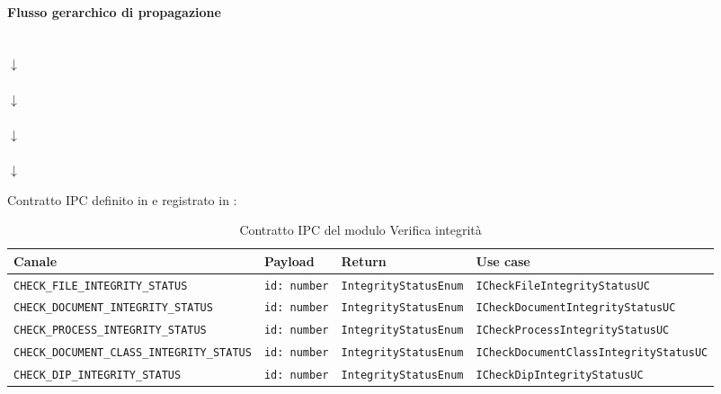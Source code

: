 \paragraph{Flusso gerarchico di propagazione}
\begin{center}
	 \\
	$\downarrow$ \\
	 \\
	$\downarrow$ \\
	 \\
	$\downarrow$ \\
	 \\
	$\downarrow$ \\
\end{center}

Contratto IPC definito in  e registrato in :

\begin{table}[H]
	\centering
	\renewcommand{\arraystretch}{1.4}
	\begin{adjustbox}{max width=\textwidth}
	\begin{tabular}{|l|l|l|l|}
		\hline
		\textbf{Canale} & \textbf{Payload} & \textbf{Return} & \textbf{Use case} \\
		\hline
		\texttt{CHECK\_FILE\_INTEGRITY\_STATUS}            & \texttt{id: number} & \texttt{IntegrityStatusEnum} & \texttt{ICheckFileIntegrityStatusUC} \\
		\hline
		\texttt{CHECK\_DOCUMENT\_INTEGRITY\_STATUS}        & \texttt{id: number} & \texttt{IntegrityStatusEnum} & \texttt{ICheckDocumentIntegrityStatusUC} \\
		\hline
		\texttt{CHECK\_PROCESS\_INTEGRITY\_STATUS}         & \texttt{id: number} & \texttt{IntegrityStatusEnum} & \texttt{ICheckProcessIntegrityStatusUC} \\
		\hline
		\texttt{CHECK\_DOCUMENT\_CLASS\_INTEGRITY\_STATUS} & \texttt{id: number} & \texttt{IntegrityStatusEnum} & \texttt{ICheckDocumentClassIntegrityStatusUC} \\
		\hline
		\texttt{CHECK\_DIP\_INTEGRITY\_STATUS}             & \texttt{id: number} & \texttt{IntegrityStatusEnum} & \texttt{ICheckDipIntegrityStatusUC} \\
		\hline
	\end{tabular}
	\end{adjustbox}
	\caption{Contratto IPC del modulo Verifica integrità}
	\label{tab:integrity:ipc}
\end{table}


